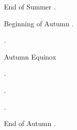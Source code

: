 \documentclass{cookbook}
\begin{document}
\begin{menu}{End of Summer}
%
{%
	\st \rice.
}%
\end{menu}

\begin{menu}{Beginning of Autumn}
%
{%
	\st \rice.
}%
\end{menu}

\begin{menu}{}
%
{%
	\st \rice.
}%
\end{menu}

\begin{menu}{Autumn Equinox}

%
{%
	\st \rice.
}%
\end{menu}

\begin{menu}{}
%
{%
	\st \rice.
}%
\end{menu}

\begin{menu}{}
%
{%
	\st \rice.
}%
\end{menu}

\begin{menu}{End of Autumn}
%
{%
	\st \rice.
}%
\end{menu}

\printindex
\end{document}
